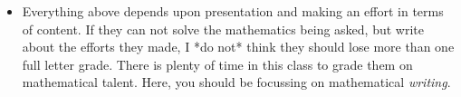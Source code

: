 \documentclass[12pt]{article}
\theoremstyle{definition}
\begin{document}
\begin{itemize}
  \item {}  Everything above depends upon presentation and making an effort in terms of content.  If they can not solve the mathematics being asked, but write about the efforts they made, I *do not* think they should lose more than one full letter grade.  There is plenty of time in this class to grade them on mathematical talent.  Here, you should be focussing on mathematical \textit{writing}.
\end{itemize}
\end{document}
